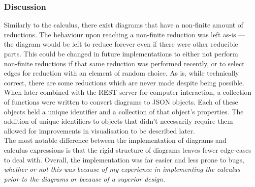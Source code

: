     \subsubsection{Discussion}
        Similarly to the calculus, there exist diagrams that have a non-finite amount of reductions.
        The behaviour upon reaching a non-finite reduction was left as-is --- the diagram would be left to reduce forever even if there were other reducible parts.
        This could be changed in future implementations to either not perform non-finite reductions if that same reduction was performed recently, or to select edges for reduction with an element of random choice.
        As is, while technically correct, there are some reductions which are never made despite being possible.\\

        When later combined with the REST server for computer interaction, a collection of functions were written to convert diagrams to JSON objects.
        Each of these objects held a unique identifier and a collection of that object's properties.
        The addition of unique identifiers to objects that didn't necessarily require them allowed for improvements in visualisation to be described later.\\

        The most notable difference between the implementation of diagrams and calculus expressions is that the rigid structure of diagrams leaves fewer edge-cases to deal with.
        Overall, the implementation was far easier and less prone to bugs, \textit{whether or not this was because of my experience in implementing the calculus prior to the diagrams or because of a superior design.}
